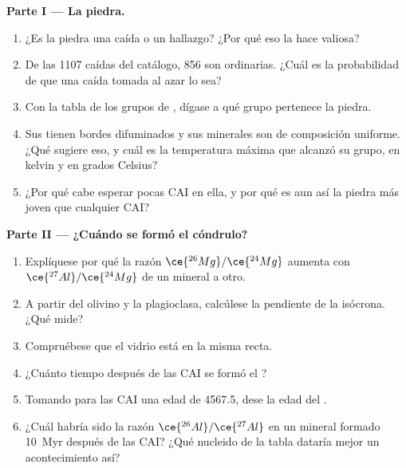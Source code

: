 \begin{problem}
\medskip
\noindent\textbf{Parte I --- La piedra.}
\begin{enumerate}
  \item ¿Es la piedra una caída o un hallazgo? ¿Por qué eso la hace valiosa?
  \item De las \num{1107} caídas del catálogo, 856 son  ordinarias. ¿Cuál
        es la probabilidad de que una caída tomada al azar lo sea?
  \item Con la tabla de los grupos de , dígase a qué grupo pertenece la piedra.
  \item Sus  tienen bordes difuminados y sus minerales son de composición
        uniforme. ¿Qué  sugiere eso, y cuál es la
        temperatura máxima que alcanzó su grupo, en kelvin y en grados Celsius?
  \item ¿Por qué cabe esperar pocas CAI en ella, y por qué es aun así la piedra
        más joven que cualquier CAI?
\end{enumerate}

\noindent\textbf{Parte II --- ¿Cuándo se formó el cóndrulo?}
\begin{enumerate}[resume]
  \item Explíquese por qué la razón $\ce{^{26}Mg}/\ce{^{24}Mg}$ aumenta con
        $\ce{^{27}Al}/\ce{^{24}Mg}$ de un mineral a otro.
  \item A partir del olivino y la plagioclasa, calcúlese la pendiente de la isócrona.
        ¿Qué mide?
  \item Compruébese que el vidrio está en la misma recta.
  \item ¿Cuánto tiempo después de las CAI se formó el ?
  \item Tomando para las CAI una edad de \qty{4567.5}{\Ma}, dese la edad del .
  \item ¿Cuál habría sido la razón $\ce{^{26}Al}/\ce{^{27}Al}$ en un mineral formado
        \qty{10}{Myr} después de las CAI? ¿Qué nucleido de la tabla dataría mejor
        un acontecimiento así?
\end{enumerate}


\end{problem}
